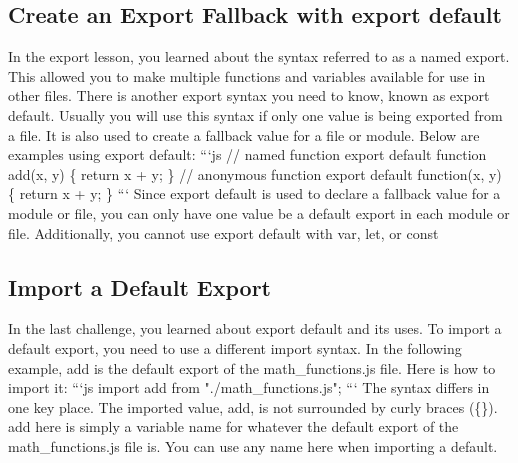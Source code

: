 \documentclass{article}%
\begin{document}
%
\subsection{Create an Export Fallback with export default}%
\label{subsec:CreateanExportFallbackwithexportdefault}%
In the export lesson, you learned about the syntax referred to as a named export. This allowed you to make multiple functions and variables available for use in other files.\newline%
There is another export syntax you need to know, known as export default. Usually you will use this syntax if only one value is being exported from a file. It is also used to create a fallback value for a file or module.\newline%
Below are examples using export default:\newline%
```js\newline%
// named function\newline%
export default function add(x, y) \{\newline%
  return x + y;\newline%
\}\newline%
// anonymous function\newline%
export default function(x, y) \{\newline%
  return x + y;\newline%
\}\newline%
```\newline%
Since export default is used to declare a fallback value for a module or file, you can only have one value be a default export in each module or file. Additionally, you cannot use export default with var, let, or const\newline%

%
\subsection{Import a Default Export}%
\label{subsec:ImportaDefaultExport}%
In the last challenge, you learned about export default and its uses. To import a default export, you need to use a different import syntax. In the following example, add is the default export of the math\_functions.js file. Here is how to import it:\newline%
```js\newline%
import add from "./math\_functions.js";\newline%
```\newline%
The syntax differs in one key place. The imported value, add, is not surrounded by curly braces (\{\}). add here is simply a variable name for whatever the default export of the math\_functions.js file is. You can use any name here when importing a default.\newline%
\end{document}
